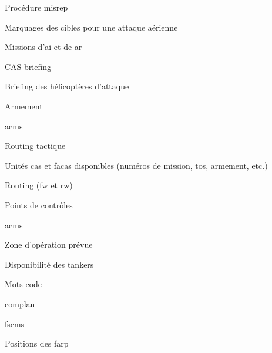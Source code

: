 \begin{e1}
\begin{e2}
\begin{e3}
\begin{e4}
\begin{e5}[0em]
					\item Procédure \gls{misrep}
					\item Marquages des cibles pour une attaque aérienne
					\item Missions d'\gls{ai} et de \gls{ar}
					\item CAS briefing
					\item Briefing des hélicoptères d'attaque
					\item Armement
					\item \glspl{acm}
					\item Routing tactique
				\end{e5}
				\begin{e5}[0em]
					\item Unités \gls{cas} et \glspl{faca} disponibles (numéros de mission, \gls{tos}, armement, etc.)
					\item Routing (\gls{fw} et \gls{rw})
					\item Points de contrôles
					\item \glspl{acm}
					\item Zone d'opération prévue
					\item Disponibilité des tankers
					\item Mots-code
					\item \gls{complan}
					\item \glspl{fscm}
					\item Positions des \gls{farp}
				\end{e5}
			\end{e4}
		\end{e3}
	\end{e2}
\end{e1}
